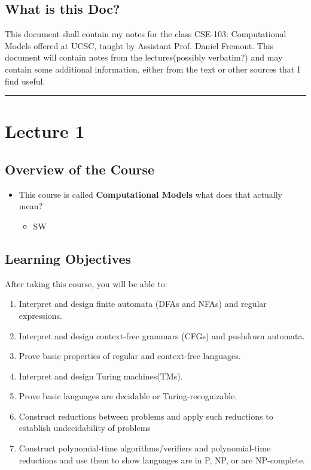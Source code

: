\documentclass[11pt]{article}
\begin{document}
\subsection*{What is this Doc?}
This document shall contain my notes for the class CSE-103: Computational Models offered at UCSC, taught by Assistant Prof. Daniel Fremont. This document will contain notes from the lectures(possibly verbatim?) and may contain some additional information, either from the text or other sources that I find useful.


\begin{center}
	\rule{450pt}{3pt} 
\end{center}
\newpage



\section*{Lecture 1}

\subsection*{Overview of the Course}
\begin{itemize}
    \item This course is called \textbf{Computational Models} what does that actually mean?
    \begin{itemize}[label=\textbullet]
        \item SW    
    \end{itemize}
\end{itemize}



\subsection*{Learning Objectives}
After taking this course, you will be able to:
\begin{enumerate}
    \item Interpret and design finite automata (DFAs and NFAs) and regular expressions.
    \item Interpret and design context-free grammars (CFGs) and pushdown automata.
    \item Prove basic properties of regular and context-free languages.
    \item Interpret and design Turing machines(TMs).
    \item Prove basic languages are decidable or Turing-recognizable.
    \item Construct reductions between problems and apply such reductions to establish undecidability of problems
    \item Construct polynomial-time algorithms/verifiers and polynomial-time reductions and use them to show languages are in P, NP, or are NP-complete.
\end{enumerate}
\end{document}

